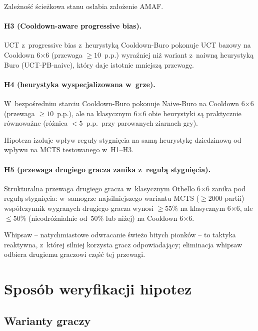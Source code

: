 \documentclass[11pt,a4paper]{article}
\begin{document}
Zależność ścieżkowa stanu osłabia założenie AMAF.

\paragraph{H3 (Cooldown-aware progressive bias).}
UCT z~progressive bias z~heurystyką Cooldown-Buro pokonuje UCT bazowy na Cooldown 6$\times$6 (przewaga $\geq 10$~p.p.) wyraźniej niż wariant z~naiwną heurystyką Buro (UCT-PB-naive), który daje istotnie mniejszą przewagę.

\paragraph{H4 (heurystyka wyspecjalizowana w~grze).}
W~bezpośrednim starciu Cooldown-Buro pokonuje Naive-Buro na Cooldown 6$\times$6 (przewaga $\geq 10$~p.p.), ale na klasycznym 6$\times$6 obie heurystyki są praktycznie równoważne (różnica $<5$~p.p.~przy parowanych ziarnach gry).

Hipoteza izoluje wpływ reguły stygnięcia na samą heurystykę dziedzinową od wpływu na MCTS testowanego w~H1--H3.

\paragraph{H5 (przewaga drugiego gracza zanika z~regułą stygnięcia).}
Strukturalna przewaga drugiego gracza w~klasycznym Othello 6$\times$6 zanika pod regułą stygnięcia: w~samogrze najsilniejszego wariantu MCTS ($\geq 2000$ partii) współczynnik wygranych drugiego gracza wynosi $\geq 55\%$ na klasycznym 6$\times$6, ale $\leq 50\%$ (nieodróżnialnie od~$50\%$ lub niżej) na Cooldown 6$\times$6.

Whipsaw -- natychmiastowe odwracanie świeżo bitych pionków -- to taktyka reaktywna, z~której silniej korzysta gracz odpowiadający; eliminacja whipsaw odbiera drugiemu graczowi część tej przewagi.

\section{Sposób weryfikacji hipotez}

\subsection{Warianty graczy}\label{sec:players}
\end{document}
